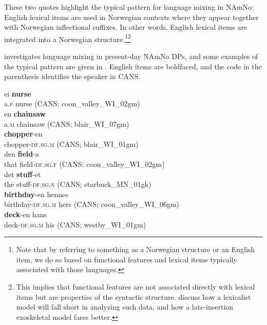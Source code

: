 \documentclass[output=paper]{langscibook}
\begin{document}
These two quotes highlight the typical pattern for language mixing in NAmNo: English lexical items are used in Norwegian contexts where they appear together with Norwegian inflectional suffixes. In other words, English lexical items are integrated into a Norwegian structure.\footnote{Note that by referring to something as a Norwegian structure or an English item, we do so based on functional features and lexical items typically associated with those languages.}\footnote{This implies that functional features are not associated directly with lexical items but are properties of the syntactic structure. \citet{GrimstadEtAl2018} discuss how a lexicalist model will fall short in analyzing such data, and how a late-insertion exoskeletal model fares better.}



\citet{Riksem2018Language} investigates language mixing in present-day NAmNo DPs, and some examples of the typical pattern are given in . English items are boldfaced, and the code in the parenthesis identifies the speaker in CANS. 


\ea \label{ex:riksem:5}
\ea \label{ex:riksem:5a}
	\gll ei \textbf{nurse}\\
	a.\textsc{f} nurse (CANS; %
    coon\_valley\_WI\_02gm)\\
\ex \label{ex:riksem:5b}
	\gll en \textbf{chainsaw}\\
		 a\textsc{.m} chainsaw (CANS; %
         blair\_WI\_07gm)\\
\ex \label{ex:riksem:5c}
	\gll \textbf{chopper}{}-en\\
		 chopper-\textsc{df.sg.m} (CANS; %
         blair\_WI\_01gm)\\
\ex \label{ex:riksem:5d}
	\gll den \textbf{field}{}-a\\
		 that field-\textsc{df.sg.f} (CANS; %
         coon\_valley\_WI\_02gm)\\
\ex \label{ex:riksem:5e}
	\gll det \textbf{stuff}{}-et\\
		 the stuff-\textsc{df.sg.n} (CANS; %
         starbuck\_MN\_01gk)\\
\ex \label{ex:riksem:5f}
	\gll \textbf{birthday}{}-en hennes\\
		 birthday-\textsc{df.sg.m} hers (CANS; %
         coon\_valley\_WI\_06gm)\\
\ex          \label{ex:riksem:5g}
	\gll \textbf{deck}{}-en hans\\
		 deck-\textsc{df.sg.m} his (CANS; %
         westby\_WI\_01gm)\\
\z
\z
\end{document}
